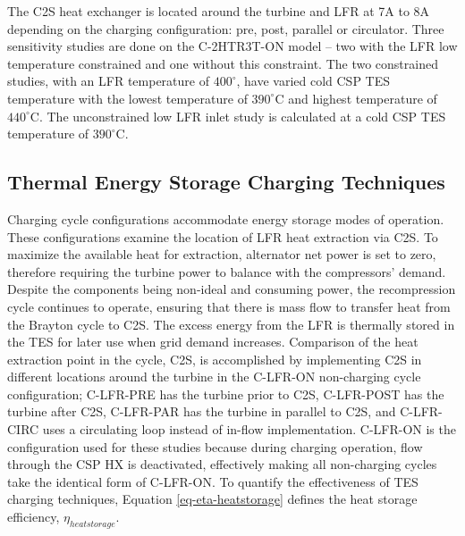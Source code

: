 \begin{paracol}{2}
\linenumbers
\switchcolumn

The C2S heat exchanger is located around the turbine and LFR at 7A to 8A depending on the charging configuration: pre, post, parallel or circulator. Three sensitivity studies are done on the C-2HTR3T-ON model -- two with the LFR low temperature constrained and one without this constraint. The two constrained studies, with an LFR temperature of $400^{\circ}$, have varied cold CSP TES temperature with the lowest temperature of $390^{\circ}$C and highest temperature of $440^{\circ}$C. The unconstrained low LFR inlet study is calculated at a cold CSP TES temperature of $390^{\circ}$C.



\subsection{Thermal Energy Storage Charging Techniques} 

Charging cycle configurations accommodate energy storage modes of operation. These configurations examine the location of LFR heat extraction via C2S. To maximize the available heat for extraction, alternator net power is set to zero, therefore requiring the turbine power to balance with the compressors' demand. Despite the components being non-ideal and consuming power, the recompression cycle continues to operate, ensuring that there is mass flow to transfer heat from the Brayton cycle to C2S. The excess energy from the LFR is thermally stored in the TES for later use when grid demand increases. Comparison of the heat extraction point in the cycle, C2S, is accomplished by implementing C2S in different locations around the turbine in the C-LFR-ON non-charging cycle configuration; C-LFR-PRE has the turbine prior to C2S, C-LFR-POST has the turbine after C2S, C-LFR-PAR has the turbine in parallel to C2S, and C-LFR-CIRC uses a circulating loop instead of in-flow implementation. C-LFR-ON is the configuration used for these studies because during charging operation, flow through the CSP HX is deactivated, effectively making all non-charging cycles take the identical form of C-LFR-ON. To quantify the effectiveness of TES charging techniques, Equation \ref{eq-eta-heatstorage} defines the heat storage efficiency, $\eta_{heatstorage}$.  


\end{paracol}
